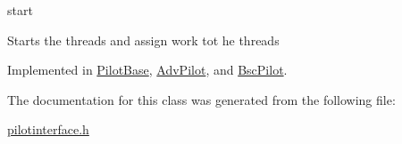 start 

Starts the threads and assign work tot he threads 

Implemented in \hyperlink{classPilotBase_a3480ea2023ca1459b32b79abf8a3400d}{Pilot\+Base}, \hyperlink{classAdvPilot_a8a6c363126dc017d6b3e2ca8cc761117}{Adv\+Pilot}, and \hyperlink{classBscPilot_a121a0ff2e9fc49b68d344d6785703702}{Bsc\+Pilot}.



The documentation for this class was generated from the following file\+:\begin{DoxyCompactItemize}
\item 
\hyperlink{pilotinterface_8h}{pilotinterface.\+h}\end{DoxyCompactItemize}
